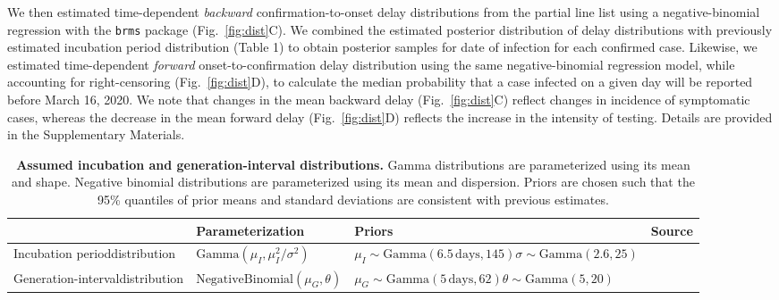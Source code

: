 \documentclass[12pt]{article}
\newcommand{\fref}[1]{Fig.~\ref{fig:#1}}
\begin{document}
We then estimated time-dependent \emph{backward} confirmation-to-onset delay distributions from the partial line list using a negative-binomial regression with the \texttt{brms} package \citep{burkner2017brms} (\fref{dist}C).
We combined the estimated posterior distribution of delay distributions with previously estimated incubation period distribution (Table 1) to obtain posterior samples for date of infection for each confirmed case.
Likewise, we estimated time-dependent \emph{forward} onset-to-confirmation delay distribution using the same negative-binomial regression model, while accounting for right-censoring (\fref{dist}D),
to calculate the median probability that a case infected on a given day will be reported before March 16, 2020.
We note that changes in the mean backward delay (\fref{dist}C) reflect changes in incidence of symptomatic cases, whereas the decrease in the mean forward delay (\fref{dist}D) reflects the increase in the intensity of testing.
Details are provided in the Supplementary Materials.

\begin{table}[t]
\begin{center}
\small
\begin{tabular}{p{4cm}|p{4.5cm}|p{4.7cm}|l}
 & Parameterization & Priors & Source \\
\hline
Incubation period\newline distribution & $\mathrm{Gamma}(\mu_I, \mu_I^2/\sigma^2)$ & $\mu_I\sim \mathrm{Gamma}(6.5\,\textrm{days}, 145)$\newline$\sigma\sim \mathrm{Gamma}(2.6, 25)$ & \citep{backer2020incubation} \\
\hline
Generation-interval\newline distribution & $\mathrm{NegativeBinomial}(\mu_G, \theta)$ & $\mu_G\sim\mathrm{Gamma}(5\,\textrm{days},62)$\newline$\theta\sim\mathrm{Gamma}(5,20)$ & \citep{ferretti2020quantifying, ganyani2020estimating} \\
\hline
\end{tabular}
\end{center}
\caption{
\textbf{Assumed incubation and generation-interval distributions.}
Gamma distributions are parameterized using its mean and shape.
Negative binomial distributions are parameterized using its mean and dispersion.
Priors are chosen such that the 95\% quantiles of prior means and standard deviations are consistent with previous estimates.
}
\end{table}
\end{document}
